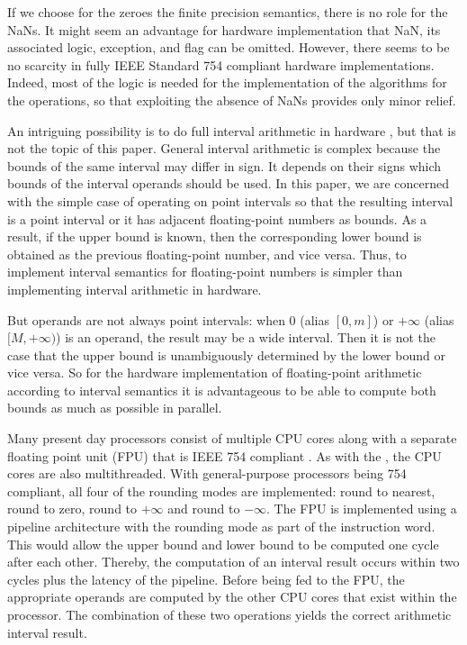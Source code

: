 \documentclass[11pt]{article}
\begin{document}
If we choose for the zeroes the finite precision semantics, there is
no role for the NaNs.  It might seem an advantage for hardware
implementation that NaN, its associated logic, exception, and flag can
be omitted. However, there seems to be no scarcity in fully IEEE
Standard 754 compliant hardware implementations. Indeed, most of the
logic is needed for the implementation of the algorithms for the
operations, so that exploiting the absence of NaNs provides only minor
relief.

An intriguing possibility is to do full interval arithmetic in
hardware \cite{iahpsun,hwsupia,vpia}, but that is not the topic of this paper.
General interval arithmetic is complex because the bounds of the same
interval may differ in sign.
It depends on their signs which bounds of the interval operands
should be used.  In this paper, we are concerned
with the simple case of operating on point intervals so that the
resulting interval is a point interval or it has adjacent floating-point
numbers as bounds.  As a result, if the upper bound is known, then the
corresponding lower bound is obtained as the previous floating-point
number, and vice versa. Thus, to implement interval semantics for
floating-point numbers is simpler than implementing interval
arithmetic in hardware.

But operands are not always point intervals: when 0 (alias $[0,m]$) or
$+\infty$ (alias $[M,+\infty)$) is an operand, the result may be a
wide interval. Then it is not the case that the upper bound is
unambiguously determined by the lower bound or vice versa. So for the
hardware implementation of floating-point arithmetic according to
interval semantics it is advantageous to be able to compute both
bounds as much as possible in parallel.

Many present day processors consist of multiple CPU cores along with a
separate floating point unit (FPU) that is IEEE 754 compliant
\cite{armfpu,osparc}. As with the \cite{osparc}, the CPU cores are
also multithreaded. With general-purpose processors being 754
compliant, all four of the rounding modes are implemented: round to
nearest, round to zero, round to $+\infty$ and round to $-\infty$. The
FPU is implemented using a pipeline architecture with the rounding
mode as part of the instruction word. This would allow the upper bound
and lower bound to be computed one cycle after each other. Thereby,
the computation of an interval result occurs within two cycles plus
the latency of the pipeline.  Before being fed to the FPU, the
appropriate operands are computed by the other CPU cores that exist
within the processor. The combination of these two operations yields
the correct arithmetic interval result.
\end{document}
